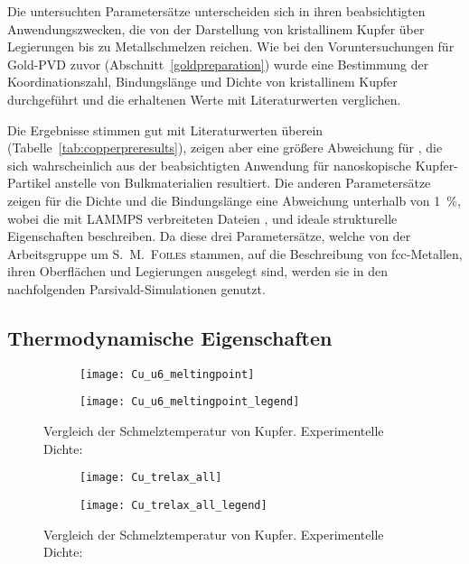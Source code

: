 Die untersuchten Parametersätze unterscheiden sich in ihren beabsichtigten Anwendungszwecken, die von der Darstellung von kristallinem Kupfer über Legierungen bis zu Metallschmelzen reichen.
Wie bei den Voruntersuchungen für Gold-PVD zuvor (Abschnitt~\ref{goldpreparation}) wurde eine Bestimmung der Koordinationszahl, Bindungslänge und Dichte von kristallinem Kupfer durchgeführt und die erhaltenen Werte mit Literaturwerten\cite{haynes_crc_2011} verglichen.

Die Ergebnisse stimmen gut mit Literaturwerten überein (Tabelle~\ref{tab:copperpreresults}), zeigen aber eine größere Abweichung für , die sich wahrscheinlich aus der beabsichtigten Anwendung für nanoskopische Kupfer-Partikel anstelle von Bulkmaterialien resultiert.
Die anderen Parametersätze zeigen für die Dichte und die Bindungslänge eine Abweichung unterhalb von \SI{1}{\percent}, wobei die mit LAMMPS verbreiteten Dateien ,  und  ideale strukturelle Eigenschaften beschreiben.
Da diese drei Parametersätze, welche von der Arbeitsgruppe um \textsc{S.~M.~Foiles}\cite{foiles_calculation_1985,foiles_embedded-atom-method_1986,adams_self-diffusion_1989} stammen, auf die Beschreibung von fcc-Metallen, ihren Oberflächen und Legierungen ausgelegt sind, werden sie in den nachfolgenden Parsivald-Simulationen genutzt.

\subsection{Thermodynamische Eigenschaften}

\begin{figure}[b!]
  \centering
  \captionsetup[subfigure]{singlelinecheck=false}
  \begin{subfigure}[c]{8cm}
    \texttt{[image: Cu\_u6\_meltingpoint]}
  \end{subfigure}
  \begin{subfigure}[c]{3cm}
    \texttt{[image: Cu\_u6\_meltingpoint\_legend]}
    \vspace{1em}
  \end{subfigure}
  \hfill
  \caption[Vergleich der Schmelztemperatur von Kupfer]{
    Vergleich der Schmelztemperatur von Kupfer.
    Experimentelle Dichte:~\cite{brillo_density_2006}
  }
  \label{fig:copperthermo}
\end{figure}

\begin{figure}[b!]
  \centering
  \captionsetup[subfigure]{singlelinecheck=false}
  \begin{subfigure}[c]{8cm}
    \texttt{[image: Cu\_trelax\_all]}
  \end{subfigure}
  \begin{subfigure}[c]{5cm}
    \texttt{[image: Cu\_trelax\_all\_legend]}
  \end{subfigure}
  \hfill
  \caption[Vergleich der Schmelztemperatur von Kupfer]{
    Vergleich der Schmelztemperatur von Kupfer.
    Experimentelle Dichte:~\cite{brillo_density_2006}
  }
  \label{fig:copperthermo2}
\end{figure}

